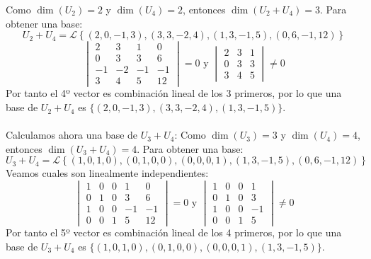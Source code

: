\begin{ejercicio}
\begin{enumerate}
    Como $\dim(U_2) = 2$ y $\dim(U_4) = 2$, entonces $\dim(U_2 + U_4) = 3$. Para obtener una base:
    \begin{equation*}
        U_2 + U_4 = \mathcal{L}\left\{(2,0,-1,3), (3,3,-2,4), (1,3,-1,5), (0,6,-1,12)\right\}
    \end{equation*}
    \begin{equation*}
        \begin{vmatrix}
            2 & 3 & 1 & 0 \\
            0 & 3 & 3 & 6 \\
            -1 & -2 & -1 & -1 \\
            3 & 4 & 5 & 12
        \end{vmatrix} = 0 \text { y } \begin{vmatrix}
            2 & 3 & 1 \\
            0 & 3 & 3 \\
            3 & 4 & 5
        \end{vmatrix} \neq 0 
    \end{equation*}
    Por tanto el 4º vector es combinación lineal de los 3 primeros, por lo que una base de $U_2 + U_4$ es $\{(2,0,-1,3), (3,3,-2,4), (1,3,-1,5)\}$.
    \\ \\
    Calculamos ahora una base de $U_3 + U_4$:
    Como $\dim(U_3) = 3$ y $\dim(U_4) = 4$, entonces $\dim(U_3 + U_4) = 4$. Para obtener una base:
    \begin{equation*}
        U_3 + U_4 = \mathcal{L}\left\{(1,0,1,0), (0,1,0,0), (0,0,0,1), (1,3,-1,5), (0,6,-1,12)\right\}
    \end{equation*}
    Veamos cuales son linealmente independientes:
    \begin{equation*}
        \begin{vmatrix}
            1 & 0 & 0 & 1 & 0 \\
            0 & 1 & 0 & 3 & 6 \\
            1 & 0 & 0 & -1 & -1 \\
            0 & 0 & 1 & 5 & 12
        \end{vmatrix} = 0 \text { y } \begin{vmatrix}
            1 & 0 & 0 & 1 \\
            0 & 1 & 0 & 3 \\
            1 & 0 & 0 & -1 \\
            0 & 0 & 1 & 5
        \end{vmatrix} \neq 0
    \end{equation*}
    Por tanto el 5º vector es combinación lineal de los 4 primeros, por lo que una base de $U_3 + U_4$ es $\{(1,0,1,0), (0,1,0,0), (0,0,0,1), (1,3,-1,5)\}$.
\end{enumerate}

\end{ejercicio}

